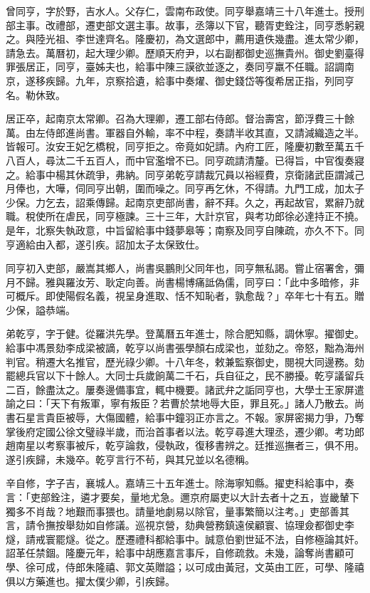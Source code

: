 \begin{pinyinscope}
曾同亨，字於野，吉水人。父存仁，雲南布政使。同亨舉嘉靖三十八年進士。授刑部主事。改禮部，遷吏部文選主事。故事，丞簿以下官，聽胥吏銓注，同亨悉躬親之。與陸光祖、李世達齊名。隆慶初，為文選郎中，薦用遺佚幾盡。進太常少卿，請急去。萬曆初，起大理少卿。歷順天府尹，以右副都御史巡撫貴州。御史劉臺得罪張居正，同亨，臺姊夫也，給事中陳三謨欲並逐之，奏同亨羸不任職。詔調南京，遂移疾歸。九年，京察拾遺，給事中奏燿、御史錢岱等復希居正指，列同亨名。勒休致。

居正卒，起南京太常卿。召為大理卿，遷工部右侍郎。督治壽宮，節浮費三十餘萬。由左侍郎進尚書。軍器自外輸，率不中程，奏請半收其直，又請減織造之半。皆報可。汝安王妃乞橋稅，同亨拒之。帝竟如妃請。內府工匠，隆慶初數至萬五千八百人，尋汰二千五百人，而中官濫增不已。同亨疏請清釐。已得旨，中官復奏寢之。給事中楊其休疏爭，弗納。同亨弟乾亨請裁冗員以裕經費，京衛諸武臣謂減己月俸也，大嘩，伺同亨出朝，圍而噪之。同亨再乞休，不得請。九門工成，加太子少保。力乞去，詔乘傳歸。起南京吏部尚書，辭不拜。久之，再起故官，累辭乃就職。稅使所在虐民，同亨極諫。三十三年，大計京官，與考功郎徐必達持正不撓。是年，北察失執政意，中旨留給事中錢夢皋等；南察及同亨自陳疏，亦久不下。同亨適給由入都，遂引疾。詔加太子太保致仕。

同亨初入吏部，嚴嵩其鄉人，尚書吳鵬則父同年也，同亨無私謁。嘗止宿署舍，彌月不歸。雅與羅汝芳、耿定向善。尚書楊博痛詆偽儒，同亨曰：「此中多暗修，非可概斥。即使陽假名義，視呈身進取、恬不知恥者，孰愈哉？」卒年七十有五。贈少保，謚恭端。

弟乾亨，字于健。從羅洪先學。登萬曆五年進士，除合肥知縣，調休寧。擢御史。給事中馮景劾李成梁被謫，乾亨以尚書張學顏右成梁也，並劾之。帝怒，黜為海州判官。稍遷大名推官，歷光祿少卿。十八年冬，敕兼監察御史，閱視大同邊務。劾罷總兵官以下十餘人。大同士兵歲餉萬二千石，兵自征之，民不勝擾。乾亨議留兵二百，餘盡汰之。屢奏邊備事宜，輒中機要。諸武弁之詬同亨也，大學士王家屏遣諭之曰：「天下有叛軍，寧有叛臣？若曹於禁地辱大臣，罪且死。」諸人乃散去。尚書石星言貴臣被辱，大傷國體，給事中鐘羽正亦言之。不報。家屏密揭力爭，乃奪掌後府定國公徐文璧祿半歲，而治首事者以法。乾亨尋進大理丞，遷少卿。考功郎趙南星以考察事被斥，乾亨論救，侵執政，復移書辨之。廷推巡撫者三，俱不用。遂引疾歸，未幾卒。乾亨言行不茍，與其兄並以名德稱。

辛自修，字子吉，襄城人。嘉靖三十五年進士。除海寧知縣。擢吏科給事中，奏言：「吏部銓注，遴才要矣，量地尤急。邇京府屬吏以大計去者十之五，豈畿輦下獨多不肖哉？地艱而事猥也。請量地劇易以除官，量事繁簡以注考。」吏部善其言，請令撫按舉劾如自修議。巡視京營，劾典營務鎮遠侯顧寰、協理僉都御史李燧，請戒寰罷燧。從之。歷遷禮科都給事中。誠意伯劉世延不法，自修極論其奸。詔革任禁錮。隆慶元年，給事中胡應嘉言事斥，自修疏救。未幾，論奪尚書顧可學、徐可成，侍郎朱隆禧、郭文英贈謚；以可成由黃冠，文英由工匠，可學、隆禧俱以方藥進也。擢太僕少卿，引疾歸。


\end{pinyinscope}
